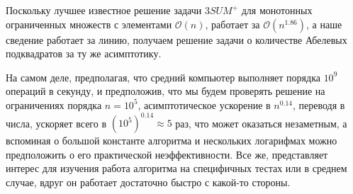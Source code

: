 Поскольку лучшее известное решение задачи $3SUM^+$ для монотонных ограниченных множеств с элементами $\mathcal{O}(n)$, работает за $\mathcal{O}(n^{1.86})$, а наше сведение работает за линию, получаем решение задачи о количестве Абелевых подквадратов за ту же асимптотику.

На самом деле, предполагая, что средний компьютер выполняет порядка $10^9$ операций в секунду, и предположив, что мы будем проверять решение на ограничениях порядка $n=10^5$, асимптотическое ускорение в $n^{0.14}$, переводя в числа, ускоряет всего в ${(10^5)}^{0.14} \approx 5$ раз, что может оказаться незаметным, а вспоминая о большой константе алгоритма и нескольких логарифмах можно предположить о его практической неэффективности. Все же, представляет интерес для изучения работа алгоритма на специфичных тестах или в среднем случае, вдруг он работает достаточно быстро с какой-то стороны.


